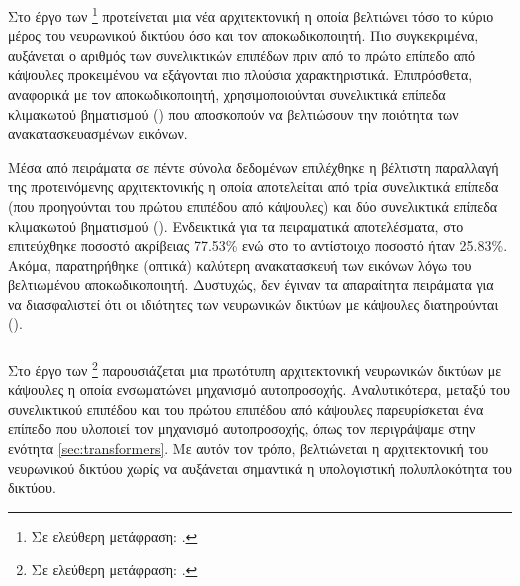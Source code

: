 \subsubsection{}

Στο έργο των  \footnote{Σε ελεύθερη μετάφραση: .} \cite{liu2019fsc} προτείνεται μια νέα αρχιτεκτονική η οποία βελτιώνει τόσο το κύριο μέρος του νευρωνικού δικτύου όσο και τον αποκωδικοποιητή. Πιο συγκεκριμένα, αυξάνεται ο αριθμός των συνελικτικών επιπέδων πριν από το πρώτο επίπεδο από κάψουλες προκειμένου να εξάγονται πιο πλούσια χαρακτηριστικά. Επιπρόσθετα, αναφορικά με τον αποκωδικοποιητή, χρησιμοποιούνται συνελικτικά επίπεδα κλιμακωτού βηματισμού () που αποσκοπούν να βελτιώσουν την ποιότητα των ανακατασκευασμένων εικόνων. \par

Μέσα από πειράματα σε πέντε σύνολα δεδομένων επιλέχθηκε η βέλτιστη παραλλαγή της προτεινόμενης αρχιτεκτονικής η οποία αποτελείται από τρία συνελικτικά επίπεδα (που προηγούνται του πρώτου επιπέδου από κάψουλες) και δύο συνελικτικά επίπεδα κλιμακωτού βηματισμού (). Ενδεικτικά για τα πειραματικά αποτελέσματα, στο  επιτεύχθηκε ποσοστό ακρίβειας 77.53\% ενώ στο  το αντίστοιχο ποσοστό ήταν 25.83\%. Ακόμα, παρατηρήθηκε (οπτικά) καλύτερη ανακατασκευή των εικόνων λόγω του βελτιωμένου αποκωδικοποιητή. Δυστυχώς, δεν έγιναν τα απαραίτητα πειράματα για να διασφαλιστεί ότι οι ιδιότητες των νευρωνικών δικτύων με κάψουλες διατηρούνται ().

\subsubsection{}

Στο έργο των  \footnote{Σε ελεύθερη μετάφραση: .} \cite{hoogi2019self} παρουσιάζεται μια πρωτότυπη αρχιτεκτονική νευρωνικών δικτύων με κάψουλες η οποία ενσωματώνει μηχανισμό αυτο\textendash προσοχής. Αναλυτικότερα, μεταξύ του συνελικτικού επιπέδου και του πρώτου επιπέδου από κάψουλες παρευρίσκεται ένα επίπεδο που υλοποιεί τον μηχανισμό αυτο\textendash προσοχής, όπως τον περιγράψαμε στην ενότητα \ref{sec:transformers}. Με αυτόν τον τρόπο, βελτιώνεται η αρχιτεκτονική του νευρωνικού δικτύου χωρίς να αυξάνεται σημαντικά η υπολογιστική πολυπλοκότητα του δικτύου.\par

